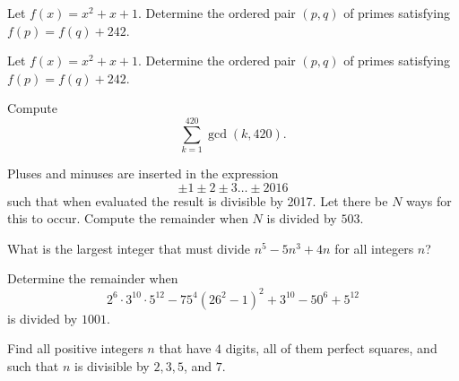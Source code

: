 \documentclass[problems.tex]{subfile}
\begin{document}
	
	
	\begin{problem}
		Let $f(x) = x^2 + x + 1$. Determine the ordered pair $(p,q)$ of primes satisfying $f(p) = f(q) + 242$. %
	\end{problem}
	
	
	
	\begin{problem}
		Let $f(x) = x^2 + x + 1$. Determine the ordered pair $(p,q)$ of primes satisfying $f(p) = f(q) + 242$. %
	\end{problem}
	
	
	
	\begin{problem}
		Compute \[\sum_{k=1}^{420} \gcd(k,420).\]
	\end{problem}
	
	
	
	\begin{problem}
		Pluses and minuses are inserted in the expression \[\pm 1 \pm 2 \pm 3 \dots \pm 2016\]such that when evaluated the result is divisible by 2017. Let there be $N$ ways for this to occur. Compute the remainder when $N$ is divided by $503$. %
	\end{problem}
	
	
	
	\begin{problem}
		What is the largest integer that must divide $n^5-5n^3+4n$ for all integers $n$? %
	\end{problem}
	
	
	
	\begin{problem}
		Determine the remainder when $$2^6\cdot3^{10}\cdot5^{12}-75^4\left(26^2-1\right)^2+3^{10}-50^6+5^{12}$$is divided by $1001$. %
	\end{problem}
	
	
	
	\begin{problem}[CentroAmerican 2016]
		Find all positive integers $n$ that have $4$ digits, all of them perfect squares, and such that $n$ is divisible by $2, 3, 5$, and $7$. %
	\end{problem}
	
\end{document}
